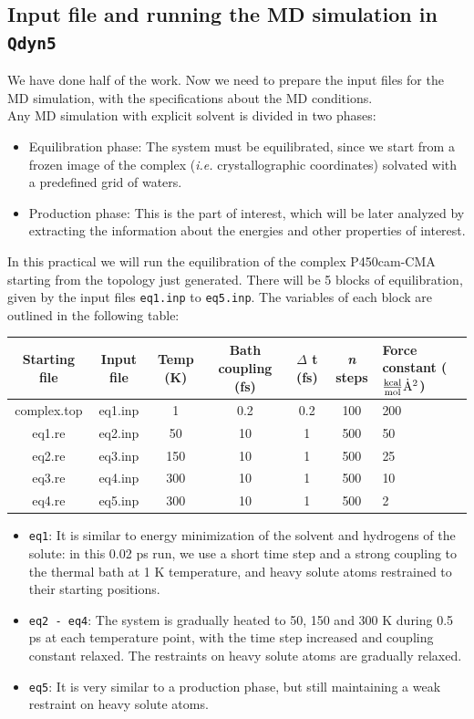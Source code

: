 \documentclass[a4paper,12pt]{article}
\newcommand{\subsctn}[1]{\subsection{#1}}
\newcommand{\qdyn}{\texttt{Qdyn5}}
\begin{document}
%
%

\subsctn {Input file and running the MD simulation in {\qdyn}}
We have done half of the work. Now we need to prepare the input files for the MD simulation, with the specifications about the MD conditions.\\
Any MD simulation with explicit solvent is divided in two phases:
    \begin {itemize}
    \item Equilibration phase: The system must be equilibrated, since we start from a frozen image of the complex ({\it i.e.} crystallographic coordinates) solvated with a predefined grid of waters.
    \item Production phase: This is the part of interest, which will be later analyzed by extracting the information about the energies and other properties of interest.
    \end {itemize}
In this practical we will run the equilibration of the complex P450cam-CMA starting from the topology just generated. There will be 5 blocks of equilibration, given by the input files \texttt{eq1.inp} to \texttt{eq5.inp}. The variables of each block are outlined in the following table:\\

\begin{center}
\begin{tabularx}{\textwidth}{|c|c|c|c|c|c|X|}
\hline
Starting file & Input file & Temp (K) & Bath coupling (fs) & $\Delta$ t (fs) & {\it n} steps & Force constant ($\mathrm{{kcal \over mol} \dot{A}^{2}}$) \\
\hline
complex.top & eq1.inp & 1 & 0.2 & 0.2 & 100 & 200 \\
eq1.re & eq2.inp & 50 & 10 & 1 & 500 & 50 \\
eq2.re & eq3.inp & 150 & 10 & 1 & 500 & 25 \\
eq3.re & eq4.inp & 300 & 10 & 1 & 500 & 10 \\
eq4.re & eq5.inp & 300 & 10 & 1 & 500 & 2 \\
\hline
\end{tabularx}
\end{center}



        \begin {itemize}
        \item \texttt{eq1}: It is similar to energy minimization of the solvent and hydrogens of the solute: in this 0.02 ps run, we use a short time step and a strong coupling to the thermal bath at 1 K temperature, and heavy solute atoms restrained to their starting positions.
        \item \texttt{eq2 - eq4}: The system is gradually heated to 50, 150 and 300 K during 0.5 ps at each temperature point, with the time step increased and coupling constant relaxed. The restraints on heavy solute atoms are gradually relaxed.
        \item \texttt{eq5}: It is very similar to a production phase, but still maintaining a weak restraint on heavy solute atoms.
        \end {itemize}
\end{document}
